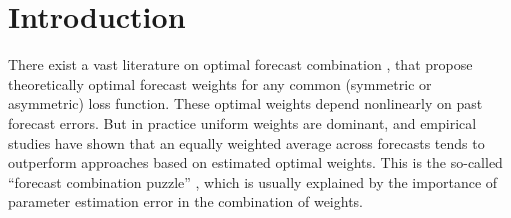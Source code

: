 \documentclass[12pt]{article}
\begin{document}

\section{Introduction}

 There exist a vast literature on optimal forecast combination \citep[see for example][]{BG69,clemen1989combining,timmermann2006forecast}, that propose theoretically optimal forecast weights for any common (symmetric or asymmetric) loss function. These optimal weights depend nonlinearly on past forecast errors. But in practice uniform weights are dominant, and empirical studies have shown that an equally weighted average across forecasts tends to outperform approaches based on estimated optimal weights. This is the so-called ``forecast combination puzzle'' \citep[see][]{SW04JoForc}, which is usually explained by the importance of parameter estimation error in the combination of weights.


\end{document}
